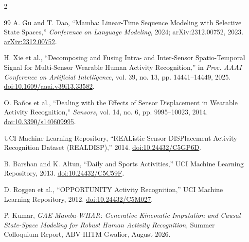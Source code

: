 \documentclass[12pt,a4paper,twoside,openright]{report}
\begin{document}
\begin{multicols}{2}
\begin{thebibliography}{99}
A. Gu and T. Dao,
``Mamba: Linear-Time Sequence Modeling with Selective State Spaces,''
\emph{Conference on Language Modeling}, 2024; arXiv:2312.00752, 2023.
\href{https://arxiv.org/abs/2312.00752}{arXiv:2312.00752}.

H. Xie et al.,
``Decomposing and Fusing Intra- and Inter-Sensor Spatio-Temporal Signal for Multi-Sensor Wearable Human Activity Recognition,''
in \emph{Proc. AAAI Conference on Artificial Intelligence}, vol. 39, no. 13, pp. 14441--14449, 2025.
\href{https://doi.org/10.1609/aaai.v39i13.33582}{doi:10.1609/aaai.v39i13.33582}.

O. Ba\~nos et al.,
``Dealing with the Effects of Sensor Displacement in Wearable Activity Recognition,''
\emph{Sensors}, vol. 14, no. 6, pp. 9995--10023, 2014.
\href{https://doi.org/10.3390/s140609995}{doi:10.3390/s140609995}.

UCI Machine Learning Repository,
``REAListic Sensor DISPlacement Activity Recognition Dataset (REALDISP),'' 2014.
\href{https://doi.org/10.24432/C5GP6D}{doi:10.24432/C5GP6D}.

B. Barshan and K. Altun,
``Daily and Sports Activities,'' UCI Machine Learning Repository, 2013.
\href{https://doi.org/10.24432/C5C59F}{doi:10.24432/C5C59F}.

D. Roggen et al.,
``OPPORTUNITY Activity Recognition,'' UCI Machine Learning Repository, 2012.
\href{https://doi.org/10.24432/C5M027}{doi:10.24432/C5M027}.

P. Kumar,
\emph{GAE-Mamba-WHAR: Generative Kinematic Imputation and Causal State-Space Modeling for Robust Human Activity Recognition},
Summer Colloquium Report, ABV-IIITM Gwalior, August 2026.

\end{thebibliography}
\end{multicols}
\end{document}
